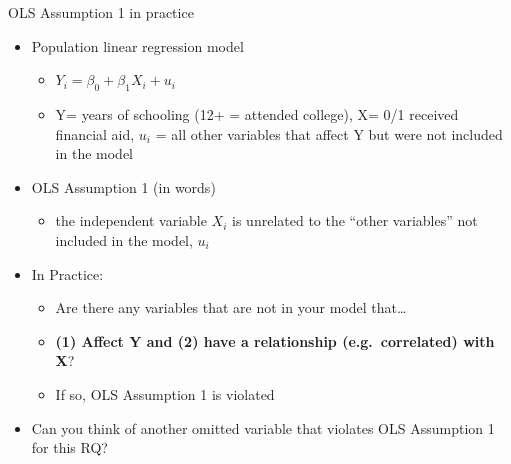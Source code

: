 \documentclass[
  8pt,
  ignorenonframetext,
  dvipsnames]{beamer}
\providecommand{\tightlist}{%
  \setlength{\itemsep}{0pt}\setlength{\parskip}{0pt}}
\renewcommand{\textbf}[1]{{\color{darkgray}\bfseries\fontfamily{Montserrat-TOsF}#1}}
\let\olditem\item
\renewcommand{\item}{%
  \olditem\vspace{4pt}
}
\begin{document}
\begin{frame}{OLS Assumption 1 in practice}
\protect\hypertarget{ols-assumption-1-in-practice}{}

\begin{itemize}
\tightlist
\item
  Population linear regression model

  \begin{itemize}
  \tightlist
  \item
    \(Y_i = \beta_0 + \beta_1 X_i+ u_i\)
  \item
    Y= years of schooling (12+ = attended college), X= 0/1 received
    financial aid, \(u_i\) = all other variables that affect Y but were
    not included in the model
  \end{itemize}
\item
  OLS Assumption 1 (in words)

  \begin{itemize}
  \tightlist
  \item
    the independent variable \(X_i\) is unrelated to the ``other
    variables'' not included in the model, \(u_i\)
  \end{itemize}
\item
  In Practice:

  \begin{itemize}
  \tightlist
  \item
    Are there any variables that are not in your model that\ldots{}
  \item
    \textbf{(1) Affect Y and (2) have a relationship (e.g.~correlated)
    with X}?
  \item
    If so, OLS Assumption 1 is violated
  \end{itemize}
\item
  Can you think of another omitted variable that violates OLS Assumption
  1 for this RQ?
\end{itemize}

\end{frame}
\end{document}
